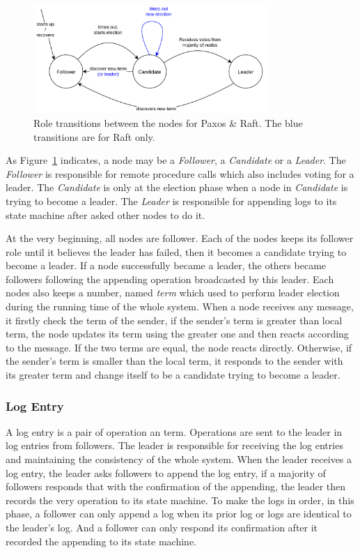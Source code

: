 \documentclass[12pt, a4paper]{article}
\begin{document}
\begin{figure}[htp]
\begin{center}
  \centering
  \includegraphics[width=0.8\textwidth]{img/roles-transitions.png}
  \caption{Role transitions between the nodes for Paxos \& Raft. The blue transitions are for Raft only.}
  \label{fig:roles-transitions}
\end{center}
\end{figure}
As Figure~\ref{fig:roles-transitions} indicates, a node may be a \textit{Follower}, 
a \textit{Candidate} or a \textit{Leader}. 
The \textit{Follower} is responsible for
remote procedure calls which also includes voting for a leader.
The \textit{Candidate} is only at the election phase when a node in \textit{Candidate}
is trying to become a leader.
The \textit{Leader} is responsible for appending logs to its state machine after
asked other nodes to do it.

At the very beginning, all nodes are follower. Each of the nodes keeps its follower role 
until it believes the leader has failed, then it becomes a candidate trying to become
a leader. If a node successfully became a leader, the others became followers following
the appending operation broadcasted by this leader.
Each nodes also keeps a number, named \textit{term} which used to perform leader election
during the running time of the whole system. When a node receives any message,
it firstly check the term of the sender, if the sender's term is greater than local term,
the node updates its term using the greater one and then reacts according to the message. 
If the two terms are equal, the node reacts directly. Otherwise, if the sender's term
is smaller than the local term, it responds to the sender with its greater term and change
itself to be a candidate trying to become a leader.

\subsubsection{Log Entry}
A log entry is a pair of operation an term. Operations are sent to the leader 
in log entries from followers. The leader is responsible for receiving the log entries and
maintaining the consistency of the whole system. 
When the leader receives a log entry, the leader asks followers to append the log entry,
if a majority of followers responds that with the confirmation of the appending,
the leader then records the very operation to its state machine.
To make the logs in order, in this phase, a follower can only append a log when 
its prior log or logs are identical to the leader's log. And a follower can only 
respond its confirmation after it recorded the appending to its state machine.
\end{document}
